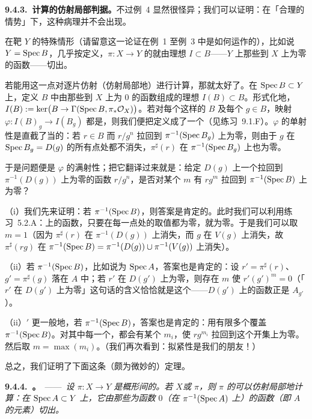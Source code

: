 \textbf{9.4.3.\ 计算\trSchemeTheoreticImage{}的仿射局部判据。}\quad 不过例~4 显然很怪异；我们可以证明：在「合理的情势」下，这种病理并不会出现。

在靶 $Y$ \trAffine{}的特殊情形（请留意这一论证在例~1 至例~3 中是如何运作的），比如说 $Y=\operatorname{Spec} B$，几乎按定义，$\pi\colon X\to Y$ 的\trSchemeTheoreticImage{}就由理想 $I\subset B$——$Y$ 上那些\trPullback{}到 $X$ 上为零的函数——切出。

若能用这一点对\trSchemeTheoreticImage{}逐片仿射（仿射局部地）进行计算，那就太好了。在\trAffine\trOpenSet{} $\operatorname{Spec} B\subset Y$ 上，定义 $B$ 中由那些\trPullback{}到 $X$ 上为 $0$ 的函数组成的理想 $I(B)\subset B$。形式化地，$I(B):=\ker\bigl(B\to\Gamma(\operatorname{Spec} B,\pi_*\mathcal{O}_X)\bigr)$。若对每个这样的 $B$ 及每个 $g\in B$，映射 $\varphi\colon I(B)_g\to I(B_g)$ 都是\trIsomorphism，则我们便把\trSchemeTheoreticImage{}定义成了一个\trClosedSubscheme（见\mbox{练习~9.1.F}）。$\varphi$ 的单射性是直截了当的：若 $r\in B$ 而 $r/g^n$ 拉回到 $\pi^{-1}(\operatorname{Spec} B_g)$ 上为零，则由于 $g$ 在 $\operatorname{Spec} B_g=D(g)$ 的所有点处都不消失，$\pi^\sharp(r)$ 在 $\pi^{-1}(\operatorname{Spec} B_g)$ 上也为零。

于是问题便是 $\varphi$ 的满射性；把它翻译过来就是：给定 $D(g)$ 上一个拉回到 $\pi^{-1}(D(g))$ 上为零的函数 $r/g^n$，是否对某个 $m$ 有 $rg^m$ 拉回到 $\pi^{-1}(\operatorname{Spec} B)$ 上为零？

（i）我们先来证明：若 $\pi^{-1}(\operatorname{Spec} B)$\trReduced，则答案是肯定的。此时我们可以利用\mbox{练习~5.2.A}：\trReduced\trScheme{}上的函数，只要在每一点处的取值都为零，就为零。于是我们可以取 $m=1$（因为 $\pi^\sharp(r)$ 在 $\pi^{-1}(D(g))$ 上消失，而 $g$ 在 $V(g)$ 上消失，故 $\pi^\sharp(rg)$ 在 $\pi^{-1}(\operatorname{Spec} B)=\pi^{-1}(D(g))\cup\pi^{-1}(V(g))$ 上消失）。

（ii）若 $\pi^{-1}(\operatorname{Spec} B)$\trAffine，比如说为 $\operatorname{Spec} A$，答案也是肯定的：设 $r'=\pi^\sharp(r)$、$g'=\pi^\sharp(g)$ 落在 $A$ 中；若 $r'$ 在 $D(g')$ 上为零，则存在 $m$ 使 $r'(g')^m=0$（「$r'$ 在 $D(g')$ 上为零」这句话的含义恰恰就是这个——$D(g')$ 上的函数正是 $A_{g'}$）。

（ii）$'$ 更一般地，若 $\pi^{-1}(\operatorname{Spec} B)$\trQuasicompact，答案也是肯定的：用有限多个\trAffine\trOpenSet{}覆盖 $\pi^{-1}(\operatorname{Spec} B)$。对其中每一个，都会有某个 $m_i$，使 $rg^{m_i}$ 拉回到这个开集上为零。然后取 $m=\max(m_i)$。（我们再次看到：拟紧性是我们的朋友！）

总之，我们证明了下面这条（颇为微妙的）定理。

\textbf{9.4.4.\ \trhTheorem{}。}\ ——\ \emph{设 $\pi\colon X\to Y$ 是概形间的\trMorphism。若 $X$\trReduced{}或 $\pi$\trQuasicompact，则 $\pi$ 的\trSchemeTheoreticImage{}可以仿射局部地计算：在 $\operatorname{Spec} A\subset Y$ 上，它由那些\trPullback{}为函数 $0$（在 $\pi^{-1}(\operatorname{Spec} A)$ 上）的函数（即 $A$ 的元素）切出。}

